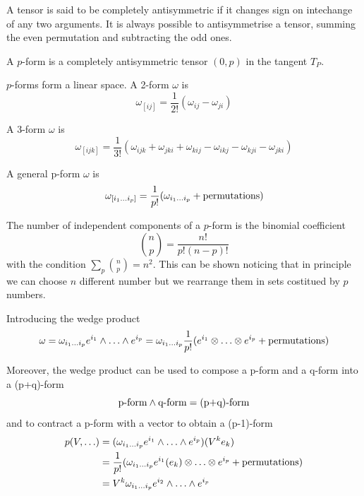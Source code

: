     A tensor is said to be completely antisymmetric if it changes sign on intechange of any two arguments. It is always possible to antisymmetrise a tensor, summing the even permutation and subtracting the odd ones.

    \begin{definition}[p-form]
        A $p$-form is a completely antisymmetric tensor $(0, p)$ in the tangent $T_P$.
    \end{definition} 
    \noindent $p$-forms form a linear space.
    A 2-form $\omega$ is 
    \begin{equation*}
        \omega_{[ij]} = \frac{1}{2!} (\omega_{ij} - \omega_{ji})
    \end{equation*}

    A 3-form $\omega$ is 
    \begin{equation*}
        \omega_{[ijk]} = \frac{1}{3!} (\omega_{ijk} + \omega_{jki} + \omega_{kij} - \omega_{ikj} - \omega_{kji} - \omega_{jki})
    \end{equation*}

    A general p-form $\omega$ is 
    \begin{equation*}
        \omega_{[i_1 \ldots i_p]} = \frac{1}{p!} (\omega_{i_1 \ldots i_p} + \textnormal{permutations})
    \end{equation*}

    The number of independent components of a $p$-form is the binomial coefficient 
    \begin{equation*}
        \binom{n}{p} = \frac{n!}{p!(n-p)!}
    \end{equation*} 
    with the condition $\sum_p \binom{n}{p} = n^2$. This can be shown noticing that in principle we can choose $n$ different number but we rearrange them in sets costitued by $p$ numbers.

    Introducing the wedge product 
    \begin{equation*}
        \omega = \omega_{i_1 \ldots i_p} e^{i_1} \wedge \ldots \wedge e^{i_p} = \omega_{i_1 \ldots i_p} \frac{1}{p!} (e^{i_1} \otimes \ldots \otimes e^{i_p} + \textnormal{permutations})
    \end{equation*}

    Moreover, the wedge product can be used to compose a p-form and a q-form into a (p+q)-form
    \begin{equation*}
        \textnormal{p-form} \wedge \textnormal{q-form} = \textnormal{(p+q)-form}
    \end{equation*}
    and to contract a p-form with a vector to obtain a (p-1)-form
    \begin{equation*}
    \begin{aligned}
        p(V, \ldots) & = (\omega_{i_1 \ldots i_p} e^{i_1} \wedge \ldots \wedge e^{i_p}) (V^k e_k) \\ & = \frac{1}{p!} (\omega_{i_1 \ldots i_p} e^{i_1}(e_k) \otimes \ldots \otimes e^{i_p} + \textnormal{permutations}) \\ & = V^k\omega_{i_1 \ldots i_p} e^{i_2} \wedge \ldots \wedge e^{i_p}
    \end{aligned}
    \end{equation*}

